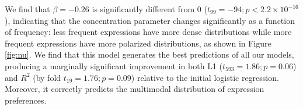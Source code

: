 \documentclass[10pt,letterpaper]{article}
\begin{document}
We find that $\beta=-0.26$ is significantly different from 0 ($t_{99}=-94; p < 2.2\times 10^{-16}$), indicating that the concentration parameter changes significantly as a function of frequency: less frequent expressions have more dense distributions while more frequent expressions have more polarized distributions, as shown in Figure \ref{fig:nu}. We find that this model generates the best predictions of all our models, producing a marginally significant improvement in both L1 ($t_{593}=1.86; p = 0.06$) and $R^{2}$ (by fold $t_{19}=1.76; p = 0.09$) relative to the initial logistic regression. Moreover, it correctly predicts the multimodal distribution of expression preferences.

\end{document}
